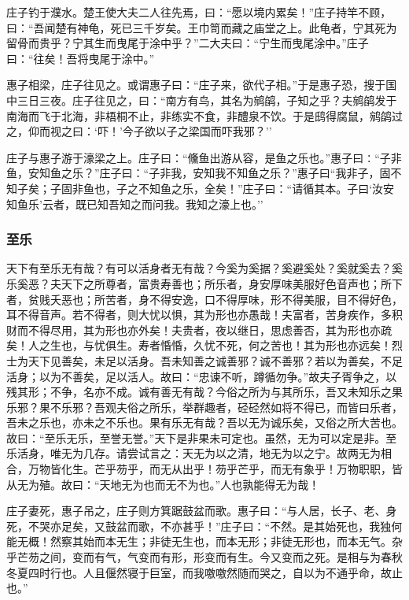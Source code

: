 \documentclass[]{article}
\begin{document}
庄子钓于濮水。楚王使大夫二人往先焉，曰：``愿以境内累矣！''庄子持竿不顾，曰：``吾闻楚有神龟，死已三千岁矣。王巾笥而藏之庙堂之上。此龟者，宁其死为留骨而贵乎？宁其生而曳尾于涂中乎？''二大夫曰：``宁生而曳尾涂中。''庄子曰：``往矣！吾将曳尾于涂中。''

惠子相梁，庄子往见之。或谓惠子曰：``庄子来，欲代子相。''于是惠子恐，搜于国中三日三夜。庄子往见之，曰：``南方有鸟，其名为鹓鹐，子知之乎？夫鹓鹐发于南海而飞于北海，非梧桐不止，非练实不食，非醴泉不饮。于是鸱得腐鼠，鹓鹐过之，仰而视之曰：`吓！'今子欲以子之梁国而吓我邪？''

庄子与惠子游于濠梁之上。庄子曰：``儵鱼出游从容，是鱼之乐也。''惠子曰∶``子非鱼，安知鱼之乐？''庄子曰：``子非我，安知我不知鱼之乐？''惠子曰``我非子，固不知子矣；子固非鱼也，子之不知鱼之乐，全矣！''庄子曰：``请循其本。子曰`汝安知鱼乐'云者，既已知吾知之而问我。我知之濠上也。''

\hypertarget{header-n307}{%
\subsubsection{至乐}\label{header-n307}}

天下有至乐无有哉？有可以活身者无有哉？今奚为奚据？奚避奚处？奚就奚去？奚乐奚恶？夫天下之所尊者，富贵寿善也；所乐者，身安厚味美服好色音声也；所下者，贫贱夭恶也；所苦者，身不得安逸，口不得厚味，形不得美服，目不得好色，耳不得音声。若不得者，则大忧以惧，其为形也亦愚哉！夫富者，苦身疾作，多积财而不得尽用，其为形也亦外矣！夫贵者，夜以继日，思虑善否，其为形也亦疏矣！人之生也，与忧俱生。寿者惛惛，久忧不死，何之苦也！其为形也亦远矣！烈士为天下见善矣，未足以活身。吾未知善之诚善邪？诚不善邪？若以为善矣，不足活身；以为不善矣，足以活人。故曰：``忠谏不听，蹲循勿争。''故夫子胥争之，以残其形；不争，名亦不成。诚有善无有哉？今俗之所为与其所乐，吾又未知乐之果乐邪？果不乐邪？吾观夫俗之所乐，举群趣者，硁硁然如将不得已，而皆曰乐者，吾未之乐也，亦未之不乐也。果有乐无有哉？吾以无为诚乐矣，又俗之所大苦也。故曰：``至乐无乐，至誉无誉。''天下是非果未可定也。虽然，无为可以定是非。至乐活身，唯无为几存。请尝试言之：天无为以之清，地无为以之宁。故两无为相合，万物皆化生。芒乎芴乎，而无从出乎！芴乎芒乎，而无有象乎！万物职职，皆从无为殖。故曰：``天地无为也而无不为也。''人也孰能得无为哉！

庄子妻死，惠子吊之，庄子则方箕踞鼓盆而歌。惠子曰：``与人居，长子、老、身死，不哭亦足矣，又鼓盆而歌，不亦甚乎！''庄子曰：``不然。是其始死也，我独何能无概！然察其始而本无生；非徒无生也，而本无形；非徒无形也，而本无气。杂乎芒芴之间，变而有气，气变而有形，形变而有生。今又变而之死。是相与为春秋冬夏四时行也。人且偃然寝于巨室，而我噭噭然随而哭之，自以为不通乎命，故止也。''
\end{document}
